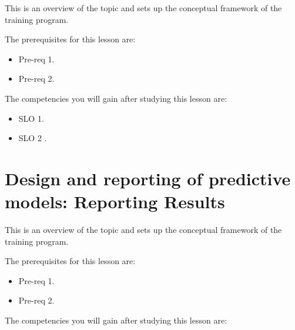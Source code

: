 This is an overview of the topic and sets up the conceptual framework of the training program.




The prerequisites for this lesson are: 




\begin{itemize}
    \item Pre-req 1.
\end{itemize}

\begin{itemize}
    \item Pre-req 2.
\end{itemize}




The competencies you will gain after studying this lesson are: 




\begin{itemize}
    \item SLO 1.
\end{itemize}

\begin{itemize}
    \item SLO 2 .
\end{itemize}

\section{Design and reporting of predictive models: Reporting Results}
\label{sec:design-and-reporting-of-predictive-models-reporting-results}

This is an overview of the topic and sets up the conceptual framework of the training program.




The prerequisites for this lesson are: 




\begin{itemize}
    \item Pre-req 1.
\end{itemize}

\begin{itemize}
    \item Pre-req 2.
\end{itemize}




The competencies you will gain after studying this lesson are: 




